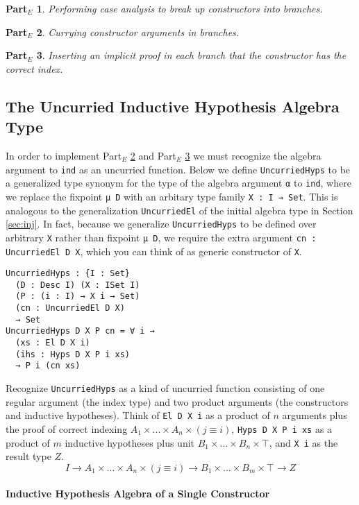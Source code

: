 \documentclass[preprint,nonatbib]{sigplanconf}
\newtheorem{myparte}{Part$_E$}
\newcommand{\refsec}[1]{Section \ref{sec:#1}}
\newcommand{\refparte}[1]{Part$_E$ \ref{parte:#1}}
\begin{document}
\begin{myparte}
\label{parte:one}
Performing case analysis to break up constructors into branches.
\end{myparte}

\begin{myparte}
\label{parte:two}
Currying constructor arguments in branches.
\end{myparte}

\begin{myparte}
\label{parte:three}
Inserting an implicit proof in each branch that the constructor has the correct index.
\end{myparte}

\subsection{The Uncurried Inductive Hypothesis Algebra Type}

In order to implement
\refparte{two} and \refparte{three} we must recognize the algebra
argument to {\tt ind} as an uncurried function.
Below we define {\tt UncurriedHyps} to be a generalized type synonym
for the type of the algebra argument {\tt α} to {\tt ind}, where we
replace the fixpoint
{\tt μ D} with an arbitary type family {\tt X : I → Set}. This is
analogous to the generalization {\tt UncurriedEl} of the initial
algebra type in \refsec{inj}. In fact, because we generalize
{\tt UncurriedHyps} to be defined over arbitrary {\tt X} rather than
fixpoint {\tt μ D}, we require the extra argument
{\tt cn : UncurriedEl D X}, which you can think of as generic
constructor of {\tt X}.

\begin{verbatim}
UncurriedHyps : {I : Set}
  (D : Desc I) (X : ISet I)
  (P : (i : I) → X i → Set)
  (cn : UncurriedEl D X)
  → Set
UncurriedHyps D X P cn = ∀ i →
  (xs : El D X i)
  (ihs : Hyps D X P i xs)
  → P i (cn xs)
\end{verbatim}

Recognize {\tt UncurriedHyps} as a kind of uncurried function
consisting of one regular argument (the index type) and two product
arguments (the constructors and inductive hypotheses). 
Think of
{\tt El D X i} as a product of $n$ arguments plus the proof of correct
indexing $A_1 × ... × A_n × (j≡i)$, {\tt Hyps D X P i xs} as a
product of $m$ inductive hypotheses plus unit $B_1 × ... × B_n × ⊤$,
and {\tt X i} as the result type $Z$.
\[
I → A_1 × ... × A_n × (j ≡ i) → B_1 × ... × B_m × ⊤ → Z
\]

\paragraph{Inductive Hypothesis Algebra of a Single Constructor}
\end{document}

